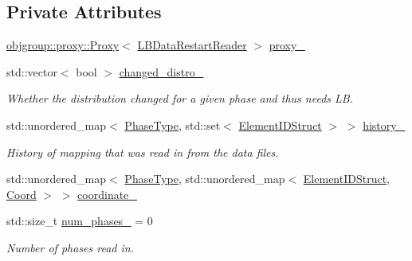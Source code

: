 \subsection*{Private Attributes}
\begin{DoxyCompactItemize}
\item 
\hyperlink{structvt_1_1objgroup_1_1proxy_1_1_proxy}{objgroup\+::proxy\+::\+Proxy}$<$ \hyperlink{structvt_1_1vrt_1_1collection_1_1balance_1_1_l_b_data_restart_reader}{L\+B\+Data\+Restart\+Reader} $>$ \hyperlink{structvt_1_1vrt_1_1collection_1_1balance_1_1_l_b_data_restart_reader_a65b1a0379efca529b3ce6cff045e047a}{proxy\+\_\+}
\item 
std\+::vector$<$ bool $>$ \hyperlink{structvt_1_1vrt_1_1collection_1_1balance_1_1_l_b_data_restart_reader_ade00b90a9eeee5d3dd05edee5d24e5a9}{changed\+\_\+distro\+\_\+}
\begin{DoxyCompactList}\small\item\em Whether the distribution changed for a given phase and thus needs LB. \end{DoxyCompactList}\item 
std\+::unordered\+\_\+map$<$ \hyperlink{namespacevt_a46ce6733d5cdbd735d561b7b4029f6d7}{Phase\+Type}, std\+::set$<$ \hyperlink{namespacevt_1_1vrt_1_1collection_1_1balance_a9f5b53fafb270212279a4757d2c4cd28}{Element\+I\+D\+Struct} $>$ $>$ \hyperlink{structvt_1_1vrt_1_1collection_1_1balance_1_1_l_b_data_restart_reader_a9c81d77c260abc1a4a203dd2c9f560a4}{history\+\_\+}
\begin{DoxyCompactList}\small\item\em History of mapping that was read in from the data files. \end{DoxyCompactList}\item 
std\+::unordered\+\_\+map$<$ \hyperlink{namespacevt_a46ce6733d5cdbd735d561b7b4029f6d7}{Phase\+Type}, std\+::unordered\+\_\+map$<$ \hyperlink{namespacevt_1_1vrt_1_1collection_1_1balance_a9f5b53fafb270212279a4757d2c4cd28}{Element\+I\+D\+Struct}, \hyperlink{structvt_1_1vrt_1_1collection_1_1balance_1_1_l_b_data_restart_reader_1_1_coord}{Coord} $>$ $>$ \hyperlink{structvt_1_1vrt_1_1collection_1_1balance_1_1_l_b_data_restart_reader_ab24e7539668dcbe68d141c2be45ad2d1}{coordinate\+\_\+}
\item 
std\+::size\+\_\+t \hyperlink{structvt_1_1vrt_1_1collection_1_1balance_1_1_l_b_data_restart_reader_a8a9f63f593ce73388ca9b2da4b705b98}{num\+\_\+phases\+\_\+} = 0
\begin{DoxyCompactList}\small\item\em Number of phases read in. \end{DoxyCompactList}\end{DoxyCompactItemize}

